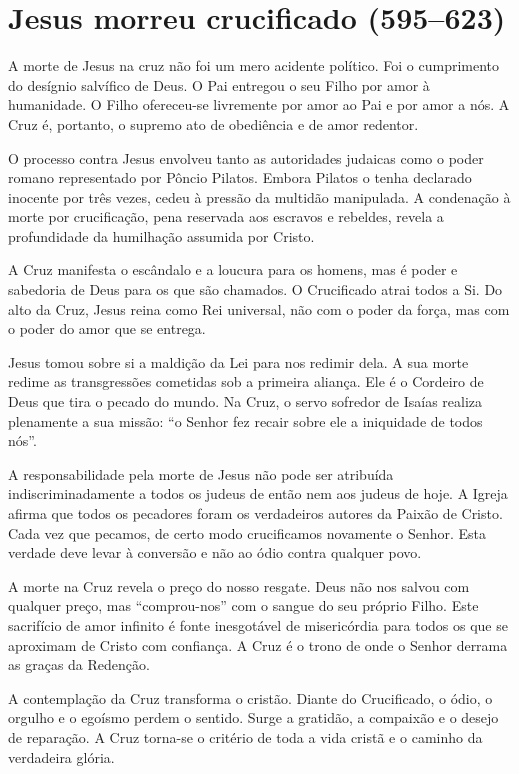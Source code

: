 \section{Jesus morreu crucificado (595--623)}

A morte de Jesus na cruz não foi um mero acidente político. Foi o cumprimento do desígnio salvífico de Deus. O Pai entregou o seu Filho por amor à humanidade. O Filho ofereceu-se livremente por amor ao Pai e por amor a nós. A Cruz é, portanto, o supremo ato de obediência e de amor redentor.

O processo contra Jesus envolveu tanto as autoridades judaicas como o poder romano representado por Pôncio Pilatos. Embora Pilatos o tenha declarado inocente por três vezes, cedeu à pressão da multidão manipulada. A condenação à morte por crucificação, pena reservada aos escravos e rebeldes, revela a profundidade da humilhação assumida por Cristo.

A Cruz manifesta o escândalo e a loucura para os homens, mas é poder e sabedoria de Deus para os que são chamados. O Crucificado atrai todos a Si. Do alto da Cruz, Jesus reina como Rei universal, não com o poder da força, mas com o poder do amor que se entrega.

Jesus tomou sobre si a maldição da Lei para nos redimir dela. A sua morte redime as transgressões cometidas sob a primeira aliança. Ele é o Cordeiro de Deus que tira o pecado do mundo. Na Cruz, o servo sofredor de Isaías realiza plenamente a sua missão: ``o Senhor fez recair sobre ele a iniquidade de todos nós''.

A responsabilidade pela morte de Jesus não pode ser atribuída indiscriminadamente a todos os judeus de então nem aos judeus de hoje. A Igreja afirma que todos os pecadores foram os verdadeiros autores da Paixão de Cristo. Cada vez que pecamos, de certo modo crucificamos novamente o Senhor. Esta verdade deve levar à conversão e não ao ódio contra qualquer povo.

A morte na Cruz revela o preço do nosso resgate. Deus não nos salvou com qualquer preço, mas ``comprou-nos'' com o sangue do seu próprio Filho. Este sacrifício de amor infinito é fonte inesgotável de misericórdia para todos os que se aproximam de Cristo com confiança. A Cruz é o trono de onde o Senhor derrama as graças da Redenção.

A contemplação da Cruz transforma o cristão. Diante do Crucificado, o ódio, o orgulho e o egoísmo perdem o sentido. Surge a gratidão, a compaixão e o desejo de reparação. A Cruz torna-se o critério de toda a vida cristã e o caminho da verdadeira glória.

